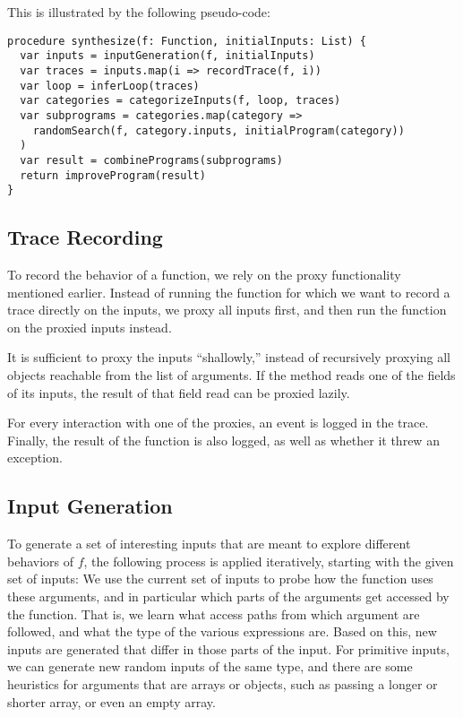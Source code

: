 \documentclass[]{article}
\begin{document}
This is illustrated by the following pseudo-code:
\begin{verbatim}
procedure synthesize(f: Function, initialInputs: List) {
  var inputs = inputGeneration(f, initialInputs)
  var traces = inputs.map(i => recordTrace(f, i))
  var loop = inferLoop(traces)
  var categories = categorizeInputs(f, loop, traces)
  var subprograms = categories.map(category =>
    randomSearch(f, category.inputs, initialProgram(category))
  )
  var result = combinePrograms(subprograms)
  return improveProgram(result)
}
\end{verbatim}



\subsection{Trace Recording}

To record the behavior of a function, we rely on the proxy functionality
mentioned earlier.  Instead of running the function for which we want to record
a trace directly on the inputs, we proxy all inputs first, and then run
the function on the proxied inputs instead.

It is sufficient to proxy the inputs ``shallowly,'' instead of recursively
proxying all objects reachable from the list of arguments.  If the method
reads one of the fields of its inputs, the result of that field read can
be proxied lazily.

For every interaction with one of the proxies, an event is logged in the trace.
Finally, the result of the function is also logged, as well as whether it
threw an exception.


\subsection{Input Generation}

To generate a set of interesting inputs that are meant to explore different
behaviors of $f$, the following process is applied iteratively, starting with
the given set of inputs:
We use the current set of inputs to probe how the function uses these arguments,
and in particular which parts of the arguments get accessed by the function.
That is, we learn what access paths from which argument are followed, and
what the type of the various expressions are.
Based on this, new inputs are generated that differ in those parts of the
input.  For primitive inputs, we can generate new random inputs of the same
type, and there are some heuristics for arguments that are arrays or objects,
such as passing a longer or shorter array, or even an empty array.
\end{document}
